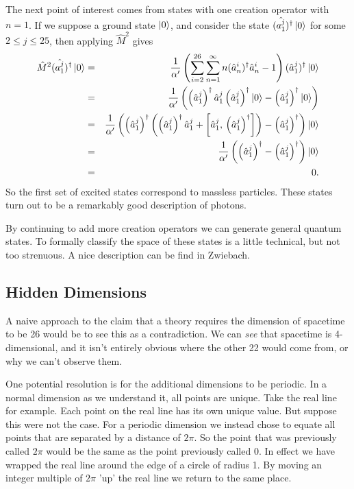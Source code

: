\documentclass[a4paper,12pt]{article}
\numberwithin{equation}{section}
\begin{document}
The next point of interest comes from states with one creation operator with $n=1$. If we suppose a ground state $\ket{0}$, and consider the state $(\hat{a_1^j})^\dagger\ket{0}$ for some $2\leq j\leq25$, then applying $\hat{M}^2$ gives
\begin{eqnarray}
\hat{M}^2(\hat{a_1^j})^\dagger\ket{0} &=& \frac{1}{\alpha'}\left(\sum_{i=2}^{26}\sum_{n=1}^\infty n(\hat{a}_{n}^i)^\dagger\hat{a}_n^i-1\right)(\hat{a}_1^j)^\dagger\ket{0}\\
&=&\frac{1}{\alpha'}\left(\left(\hat{a}_1^j\right)^\dagger\hat{a}_1^j\left(\hat{a}_1^j\right)^\dagger\ket{0}-\left(\hat{a}_1^j\right)^\dagger\ket{0}\right)\\
&=&\frac{1}{\alpha'}\left(\left(\hat{a}_1^j\right)^\dagger\left(\left(\hat{a}_1^j\right)^\dagger\hat{a}_1^j+\left[\hat{a}_1^j,\,\left(\hat{a}_1^j\right)^\dagger\right]\right)-\left(\hat{a}_1^j\right)^\dagger \right)\ket{0}\\
&=&\frac{1}{\alpha'}\left(\left(\hat{a}_1^j\right)^\dagger-\left(\hat{a}_1^j\right)^\dagger\right)\ket{0}\\
&=& 0.
\end{eqnarray}
So the first set of excited states correspond to massless particles. These states turn out to be a remarkably good description of photons.

By continuing to add more creation operators we can generate general quantum states. To formally classify the space of these states is a little technical, but not too strenuous. A nice description can be find in Zwiebach\cite{zwiebach}.
\subsection{Hidden Dimensions}
A naive approach to the claim that a theory requires the dimension of spacetime to be 26 would be to see this as a contradiction. We can \emph{see} that spacetime is 4-dimensional, and it isn't entirely obvious where the other 22 would come from, or why we can't observe them.

One potential resolution is for the additional dimensions to be periodic. In a normal dimension as we understand it, all points are unique. Take the real line for example. Each point on the real line has its own unique value. But suppose this were not the case. For a periodic dimension we instead chose to equate all points that are separated by a distance of $2\pi$. So the point that was previously called $2\pi$ would be the same as the point previously called 0. In effect we have wrapped the real line around the edge of a circle of radius 1. By moving an integer multiple of $2\pi$ 'up' the real line we return to the same place.
\end{document}
